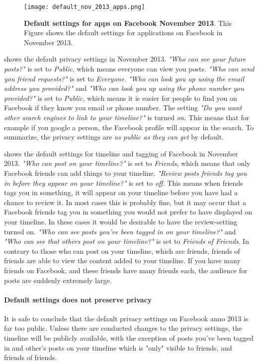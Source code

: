 \begin{figure}[h!]
\centering
\texttt{[image: default\_nov\_2013\_apps.png]}
\caption[Default settings for apps on Facebook November 2013]{\textbf{Default  settings for apps on Facebook November 2013}. This Figure shows the default settings for applications on Facebook in November 2013.} 
\label{fig:apps2013}
\end{figure}

 shows the default privacy settings in November 2013.  \textit{"Who can see your future posts?"} is set to \textit{Public}, which means everyone can view you posts. \textit{"Who can send you friend requests?"} is set to \textit{Everyone}. \textit{"Who can look you up using the email address you provided?"} and \textit{"Who can look you up using the phone number you provided?"} is set to \textit{Public}, which means it is easier for people to find you on Facebook if they know you email or phone number. The setting \textit{"Do you want other search engines to link to your timeline?"} is turned \textit{on}. This means that for example if you google a person, the Facebook profile will appear in the search. To summarize, the privacy settings are \textit{as public as they can get} by default. 

 shows the default settings for timeline and tagging of Facebook in November 2013. \textit{"Who can post on your timeline?"} is set to \textit{Friends}, which means that only Facebook friends can add things to your timeline. \textit{"Review posts friends tag you in before they appear on your timeline?" }is set to\textit{ off}. This means when friends tags you in something, it will appear on your timeline before you have had a chance to review it. In most cases this is probably fine, but it may occur that a Facebook friends tag you in something you would not prefer to have displayed on your timeline. In these cases it would be desirable to have the review-setting turned on. \textit{"Who can see posts you've been tagged in on your timeline?"} and \textit{"Who can see that others post on your timeline?"} is set to \textit{Friends of Friends}. In contrary to those who can post on your timeline, which are friends, friends of friends are able to view the content added to your timeline. If you have many friends on Facebook, and these friends have many friends each, the audience for posts are suddenly extremely large. 

\paragraph{Default settings does not preserve privacy} It is safe to conclude that the default privacy settings on Facebook anno 2013 is far too public. Unless there are conducted changes to the privacy settings, the timeline will be publicly available, with the exception of posts you've been tagged in and other's posts on your timeline which is "only" visible to friends, and friends of friends. 

